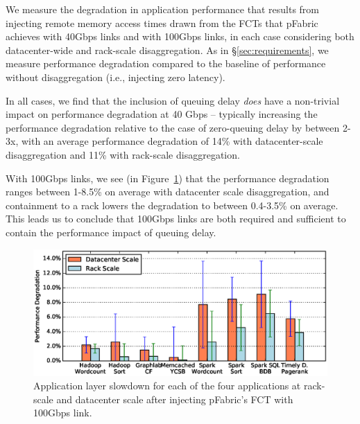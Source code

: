 We measure the degradation in application performance that results from injecting remote memory access times drawn from the FCTs that pFabric achieves with 40Gbps links and with 100Gbps links, in each case considering both datacenter-wide and rack-scale disaggregation. As in \S\ref{sec:requirements}, we measure performance degradation compared to the baseline of performance without disaggregation (i.e., injecting zero latency). 

In all cases, we find that the inclusion of queuing delay \emph{does} have a non-trivial impact on performance degradation at 40 Gbps -- typically increasing the performance degradation relative to the case of zero-queuing delay by between 2-3x, with an average performance degradation of 14\% with datacenter-scale disaggregation and 11\% with rack-scale disaggregation. 

With 100Gbps links, we see (in Figure~\ref{fig:appfabric100}) that the performance degradation ranges between 1-8.5\% on average with datacenter scale disaggregation, and containment to a rack lowers the degradation to between 0.4-3.5\% on average.
This leads us to conclude that 100Gbps links are both required and sufficient to contain the performance impact of queuing delay.
%
%
\begin{figure}
  \centering
    \includegraphics[width = \columnwidth]{img/slowdown.eps} 
  \caption{\small{Application layer slowdown for each of the four applications at rack-scale and datacenter scale after injecting pFabric's FCT with 100Gbps link. }}
  \label{fig:appfabric100}
\end{figure}
%


